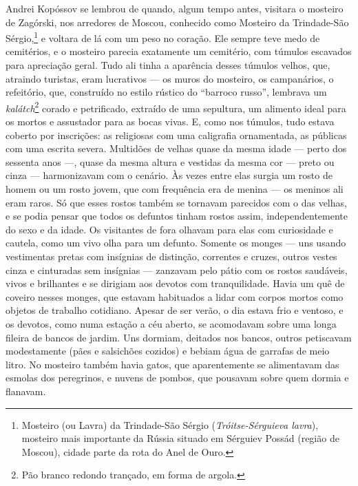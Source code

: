 Andrei Kopóssov se lembrou de quando, algum tempo antes, visitara o
mosteiro de Zagórski, nos arredores de Moscou, conhecido como Mosteiro
da Trindade-São Sérgio,\footnote{Mosteiro (ou Lavra) da Trindade-São
  Sérgio (\emph{Tróitse-Sérguieva lavra}), mosteiro mais importante da
  Rússia situado em Sérguiev Possád (região de Moscou), cidade parte da
  rota do Anel de Ouro.} e voltara de lá com um peso no coração. Ele
sempre teve medo de cemitérios, e o mosteiro parecia exatamente um
cemitério, com túmulos escavados para apreciação geral. Tudo ali tinha a
aparência desses túmulos velhos, que, atraindo turistas, eram lucrativos
--- os muros do mosteiro, os campanários, o refeitório, que, construído
no estilo rústico do ``barroco russo'', lembrava um
\emph{kalátch}\footnote{Pão branco redondo trançado, em forma de argola.}
corado e petrificado, extraído de uma sepultura, um alimento ideal para
os mortos e assustador para as bocas vivas. E, como nos túmulos, tudo
estava coberto por inscrições: as religiosas com uma caligrafia
ornamentada, as públicas com uma escrita severa. Multidões de velhas
quase da mesma idade --- perto dos sessenta anos ---, quase da mesma
altura e vestidas da mesma cor --- preto ou cinza --- harmonizavam com o
cenário. Às vezes entre elas surgia um rosto de homem ou um rosto jovem,
que com frequência era de menina --- os meninos ali eram raros. Só que
esses rostos também se tornavam parecidos com o das velhas, e se podia
pensar que todos os defuntos tinham rostos assim, independentemente do
sexo e da idade. Os visitantes de fora olhavam para elas com curiosidade
e cautela, como um vivo olha para um defunto. Somente os monges --- uns
usando vestimentas pretas com insígnias de distinção, correntes e
cruzes, outros vestes cinza e cinturadas sem insígnias --- zanzavam pelo
pátio com os rostos saudáveis, vivos e brilhantes e se dirigiam aos
devotos com tranquilidade. Havia um quê de coveiro nesses monges, que
estavam habituados a lidar com corpos mortos como objetos de trabalho
cotidiano. Apesar de ser verão, o dia estava frio e ventoso, e os
devotos, como numa estação a céu aberto, se acomodavam sobre uma longa
fileira de bancos de jardim. Uns dormiam, deitados nos bancos, outros
petiscavam modestamente (pães e salsichões cozidos) e bebiam água de
garrafas de meio litro. No mosteiro também havia gatos, que
aparentemente se alimentavam das esmolas dos peregrinos, e nuvens de
pombos, que pousavam sobre quem dormia e flanavam.


